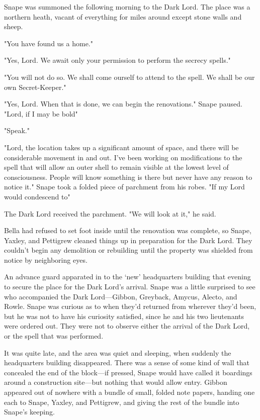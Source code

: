 Snape was summoned the following morning to the Dark Lord. The place was a northern heath, vacant of everything for miles around except stone walls and sheep.

"You have found us a home."

"Yes, Lord. We await only your permission to perform the secrecy spells."

"You will not do so. We shall come ourself to attend to the spell. We shall be our own Secret-Keeper."

"Yes, Lord. When that is done, we can begin the renovations." Snape paused. "Lord, if I may be bold{\el}"

"Speak."

"Lord, the location takes up a significant amount of space, and there will be considerable movement in and out. I've been working on modifications to the spell that will allow an outer shell to remain visible at the lowest level of consciousness. People will know something is there but never have any reason to notice it." Snape took a folded piece of parchment from his robes. "If my Lord would condescend to{\el}"

The Dark Lord received the parchment. "We will look at it," he said.

Bella had refused to set foot inside until the renovation was complete, so Snape, Yaxley, and Pettigrew cleaned things up in preparation for the Dark Lord. They couldn't begin any demolition or rebuilding until the property was shielded from notice by neighboring eyes.

An advance guard apparated in to the `new' headquarters building that evening to secure the place for the Dark Lord's arrival. Snape was a little surprised to see who accompanied the Dark Lord—Gibbon, Greyback, Amycus, Alecto, and Rowle. Snape was curious as to when they'd returned from wherever they'd been, but he was not to have his curiosity satisfied, since he and his two lieutenants were ordered out. They were not to observe either the arrival of the Dark Lord, or the spell that was performed.

It was quite late, and the area was quiet and sleeping, when suddenly the headquarters building disappeared. There was a sense of some kind of wall that concealed the end of the block—if pressed, Snape would have called it boardings around a construction site—but nothing that would allow entry. Gibbon appeared out of nowhere with a bundle of small, folded note papers, handing one each to Snape, Yaxley, and Pettigrew, and giving the rest of the bundle into Snape's keeping.


